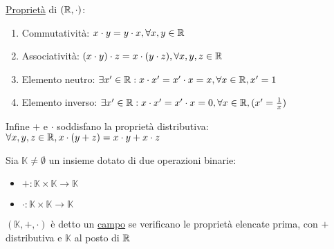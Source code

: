 \documentclass{article}
\begin{document}
\ul{Proprietà} di $(\mathbb{R},\cdot)$:
\begin{enumerate}
	\item Commutatività: $x\cdot y=y\cdot x,\forall x,y\in\mathbb{R}$
	\item Associatività: $(x\cdot y)\cdot z=x\cdot(y\cdot z),\forall x,y,z\in\mathbb{R}$
	\item Elemento neutro: $\exists x'\in\mathbb{R}:x\cdot x'=x'\cdot x=x,\forall x\in\mathbb{R},x'=1$
	\item Elemento inverso: $\exists x'\in\mathbb{R}:x\cdot x'=x'\cdot x=0,\forall x\in\mathbb{R},(x'=\frac{1}{x})$
\end{enumerate}
Infine $+$ e $\cdot$ soddisfano la proprietà distributiva: $\forall x,y,z\in\mathbb{R},x\cdot(y+z)=x\cdot y+x\cdot z$

Sia $\mathbb{K}\not=\emptyset$ un insieme dotato di due operazioni binarie:
\begin{itemize}
	\item $+:\mathbb{K}\times\mathbb{K}\rightarrow\mathbb{K}$
	\item $\cdot:\mathbb{K}\times\mathbb{K}\rightarrow\mathbb{K}$
\end{itemize}
$(\mathbb{K},+,\cdot)$ è detto un \ul{campo} se verificano le proprietà elencate prima, con $+$ distributiva e $\mathbb{K}$ al posto di $\mathbb{R}$

\end{document}
